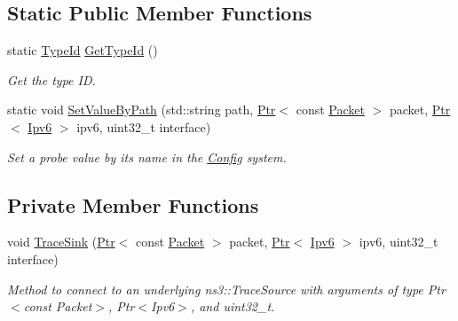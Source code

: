 \subsection*{Static Public Member Functions}
\begin{DoxyCompactItemize}
\item 
static \hyperlink{classns3_1_1TypeId}{Type\+Id} \hyperlink{classns3_1_1Ipv6PacketProbe_a29ddf89d820591b83f6723a7fdb7e377}{Get\+Type\+Id} ()
\begin{DoxyCompactList}\small\item\em Get the type ID. \end{DoxyCompactList}\item 
static void \hyperlink{classns3_1_1Ipv6PacketProbe_adcf032a31a1a37be0e28e565d07edfba}{Set\+Value\+By\+Path} (std\+::string path, \hyperlink{classns3_1_1Ptr}{Ptr}$<$ const \hyperlink{classns3_1_1Packet}{Packet} $>$ packet, \hyperlink{classns3_1_1Ptr}{Ptr}$<$ \hyperlink{classns3_1_1Ipv6}{Ipv6} $>$ ipv6, uint32\+\_\+t interface)
\begin{DoxyCompactList}\small\item\em Set a probe value by its name in the \hyperlink{namespacens3_1_1Config}{Config} system. \end{DoxyCompactList}\end{DoxyCompactItemize}
\subsection*{Private Member Functions}
\begin{DoxyCompactItemize}
\item 
void \hyperlink{classns3_1_1Ipv6PacketProbe_a4a45afbe38699ca6cf3082bdbd1a0579}{Trace\+Sink} (\hyperlink{classns3_1_1Ptr}{Ptr}$<$ const \hyperlink{classns3_1_1Packet}{Packet} $>$ packet, \hyperlink{classns3_1_1Ptr}{Ptr}$<$ \hyperlink{classns3_1_1Ipv6}{Ipv6} $>$ ipv6, uint32\+\_\+t interface)
\begin{DoxyCompactList}\small\item\em Method to connect to an underlying ns3\+::\+Trace\+Source with arguments of type Ptr$<$const Packet$>$, Ptr$<$\+Ipv6$>$, and uint32\+\_\+t. \end{DoxyCompactList}\end{DoxyCompactItemize}

